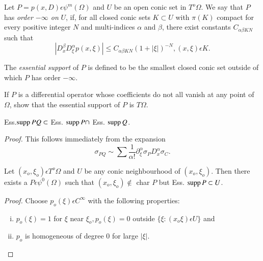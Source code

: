 \setcounter{defi}{48}
\begin{defi}\label{chap4:sec9:def4.49}%
  Let $P=p(x,D) \epsilon \psi^m (\Omega)$ and $U$ be an open conic
  set in $T^o \Omega$. We say that $P$ has \textit{ order $-\infty$ on}
  $U$, if,  for all closed conic sets $K \subset U $ with $\pi(K)$
  compact for every positive integer $N$ and multi-indices $\alpha$
  and $\beta$, there exist constants $C_{\alpha \beta K N}$ such that  
  $$
  |D^{\beta}_x D^{\alpha}_{\xi} p(x, \xi) | \leq C_{\alpha \beta K N} (1+
  |\xi|)^{-N}, (x, \xi) \epsilon K. 
  $$
\end{defi}

The \textit{ essential support } of $P$ is defined to be the smallest
closed conic set outside of which $P$ has order $-\infty$. 

\begin{exercise}
  If $P$ is a differential operator whose coefficients do not all vanish
  at any point of $\Omega$, show that the essential support of $P$ is $T
  \Omega$. 
\end{exercise}

\setcounter{prop}{49}
\begin{prop}\label{chap4:sec9:prop4.50}%
  Ess.\pageoriginale $\operatorname{supp} P Q \subset $ Ess. $\operatorname{supp} P \cap $ Ess. $\operatorname{supp} Q$.
\end{prop}

\noindent\textit{Proof.}
  This follows immediately from the expansion
  \begin{equation*}
  \sigma_{PQ}\sim \sum \frac{1}{\alpha!} \partial^{\alpha}_{\xi} \sigma_P
  D^{\alpha}_x \sigma_{C}.\tag*{$\Box$} 
  \end{equation*}

\setcounter{lem}{50}
\begin{lem}\label{chap4:sec9:lem4.51}%
  Let $(x_o,  \xi_o) \epsilon T^o \Omega$ and $U$ be any conic
  neighbourhood of $(x_o,  \xi_o) $. Then there exists a $P
  \epsilon \psi^0 (\Omega)$ such that $(x_o,  \xi_o) \notin$ char
  $P$ but Ess. $\operatorname{supp} P \subset U$. 
\end{lem}

\begin{proof}
  Choose $p_o (\xi) \epsilon C^{\infty}$ with the following properties: 
  \begin{enumerate}[i)]
  \item $p_o (\xi)=1$ for $\xi$ near $\xi_o, p_o (\xi) = 0$ outside $\{ \xi :
    (x_o \xi) \epsilon U \}$ and 
  \item $p_o$ is homogeneous of degree $0$ for large $|\xi|$.
  \end{enumerate}
\end{proof}

